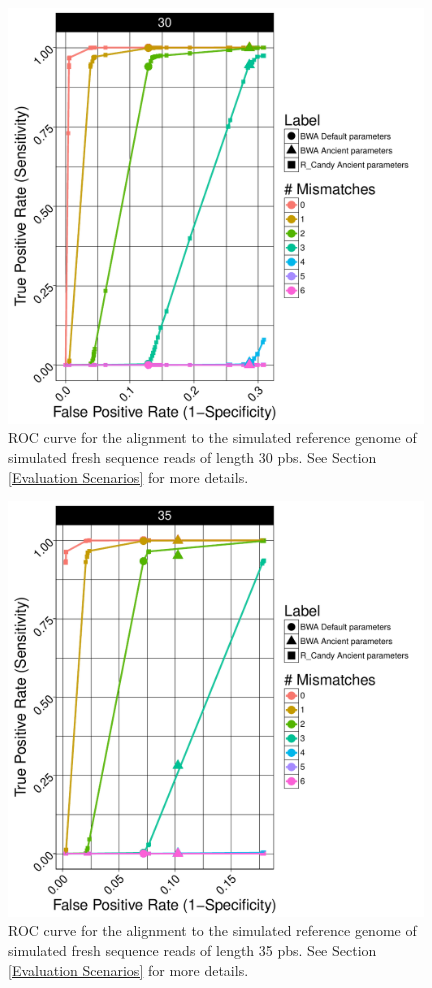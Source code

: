 \documentclass[11pt,a4paper]{report}
\begin{document}
\begin{figure}[H]
\centering
\includegraphics[width=11cm]{pictures/DS3_30_21_47_emp.pdf}
\caption{
ROC curve for the alignment to the simulated reference genome of simulated 
fresh sequence reads of length 30 pbs. See Section \ref{Evaluation Scenarios}
for more details.}
\label{DS3_30}
\end{figure}

\begin{figure}[H]
\centering
\includegraphics[width=11cm]{pictures/DS3_35_19_emp.pdf}

\caption{
ROC curve for the alignment to the simulated reference genome of simulated 
fresh sequence reads of length 35 pbs. See Section \ref{Evaluation Scenarios}
for more details.}

\label{DS3_35}
\end{figure}
\end{document}

